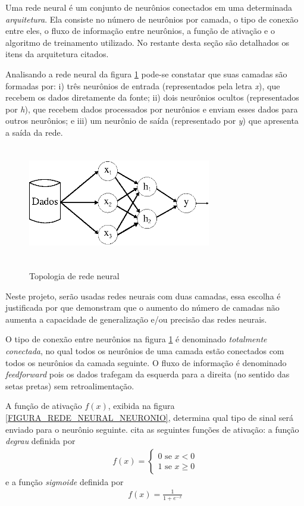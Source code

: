 Uma rede neural é um conjunto de neurônios conectados em uma determinada \emph{arquitetura}. Ela consiste no número de neurônios por camada, o tipo de conexão entre eles, o fluxo de informação entre neurônios, a função de ativação e o algoritmo de treinamento utilizado. No restante desta seção são detalhados os itens da arquitetura citados.

Analisando a rede neural da figura \ref{FIGURA_REDE_NEURAL_TOPOLOGIA} pode-se constatar que suas camadas são formadas por: i) três neurônios de entrada (representados pela letra \emph{x}), que recebem os dados diretamente da fonte; ii) dois neurônios ocultos (representados por \emph{h}), que recebem dados processados por neurônios e enviam esses dados para outros neurônios; e iii) um neurônio de saída (representado por \emph{y}) que apresenta a saída da rede.
\begin{figure}[hbt]
	\centering
 	  \caption{Topologia de rede neural}
		\includegraphics[width=8cm,height=5cm]{./secoes/conceitosFundamentais/pics/img/RedeNeuralTopologia.eps}
	\label{FIGURA_REDE_NEURAL_TOPOLOGIA}
\end{figure}

Neste projeto, serão usadas redes neurais com duas camadas, essa escolha é justificada por  que demonstram que o aumento do número de camadas não aumenta a capacidade de generalização e/ou precisão das redes neurais.

O tipo de conexão entre neurônios na figura \ref{FIGURA_REDE_NEURAL_TOPOLOGIA} é denominado \emph{totalmente conectada}, no qual todos os neurônios de uma camada estão conectados com todos os neurônios da camada seguinte. O fluxo de informação é denominado \emph{feedforward} pois os dados trafegam da esquerda para a direita (no sentido das setas pretas) sem retroalimentação.

A função de ativação \(f(x)\), exibida na figura \ref{FIGURA_REDE_NEURAL_NEURONIO}, determina qual tipo de sinal será enviado para o neurônio seguinte.  cita as seguintes funções de ativação: a função \emph{degrau} definida por
\begin{align}
f(x) = \begin{cases}
		0 \mbox{ se } x < 0 	 \\
		1 \mbox{ se } x \geq 0	 \label{EQU_FUNCAO_DEGRAU}				
	   \end{cases}
\end{align}
e a função \emph{sigmoide} definida por
\begin{align}
f(x) = \frac{1}{1 + e^{-x}} 	\label{EQU_FUNCAO_SIGMOIDE}
\end{align}

